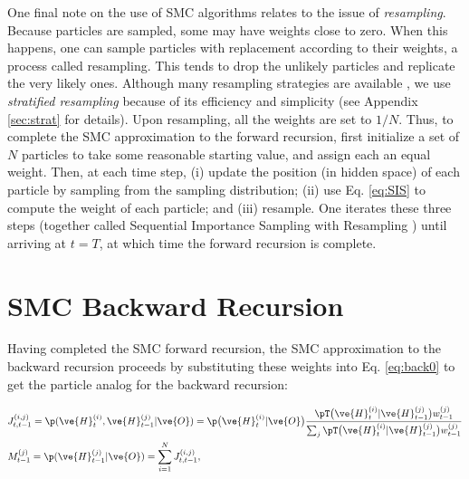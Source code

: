 \documentclass{article}
\begin{document}
One final note on the use of SMC algorithms relates to the issue of \emph{resampling}. Because particles are sampled, some may have weights close to zero. When this happens, one can sample particles with replacement according to their weights, a process called resampling.  This tends to drop the unlikely particles and replicate the very likely ones. Although many resampling strategies are available \cite{DoucMoulines05}, we use \emph{stratified resampling} because of its efficiency and simplicity (see Appendix \ref{sec:strat} for details). Upon resampling, all the weights are set to $1/N$. Thus, to complete the SMC approximation to the forward recursion, first initialize a set of $N$ particles to take some reasonable starting value, and assign each an equal weight.  Then, at each time step, (i) update the position (in hidden space) of each particle by sampling from the sampling distribution; (ii) use Eq. \ref{eq:SIS} to compute the weight of each particle; and (iii) resample. One iterates these three steps (together called Sequential Importance Sampling with Resampling \cite{DoucetGordon01}) until arriving at $t=T$, at which time the forward recursion is complete.

\section{SMC Backward Recursion}

Having completed the SMC forward recursion, the SMC approximation to the backward recursion proceeds by substituting these weights into Eq. \ref{eq:back0} to get the particle analog for the backward recursion:

\begin{subequations} \label{eq:part_back}
\begin{align} \label{eq:part_joint}
&J^{(i,j)}_{t,t-1} = \p(\ve{H}_t^{(i)}, \ve{H}_{t-1}^{(j)} | \ve{O}) %
=\p \big(\ve{H}^{(i)}_t | \ve{O}\big) \frac{
\pT \big(\ve{H}^{(i)}_t | \ve{H}^{(j)}_{t-1} \big)
w_{t-1}^{(j)}}{\sum_j \pT \big(\ve{H}^{(i)}_t | \ve{H}^{(j)}_{t-1} \big) w_{t-1}^{(j)}}
\\ \label{eq:part_marg} &M^{(j)}_{t-1} = \p(\ve{H}_{t-1}^{(j)} | \ve{O})
= \sum_{i=1}^N J^{(i,j)}_{t,t-1},
\end{align}
\end{subequations}
\end{document}
